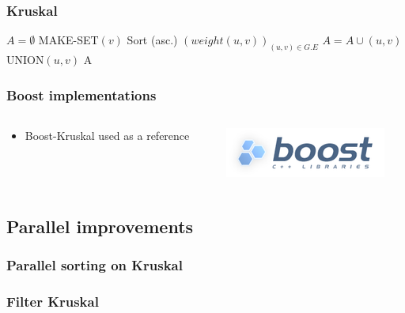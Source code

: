 \documentclass{beamer}
\begin{document}
\begin{frame}[fragile]
\frametitle{Kruskal}
\small
\begin{algorithm}[H]
\begin{algorithmic}[1]
\STATE $A = \emptyset$
\STATE MAKE-SET$(v)$
\ENDFOR
\STATE Sort (asc.) $\left(weight(u, v)\right)_{(u, v) \in G.E}$
\STATE $A = A \cup {(u, v)}$
\STATE UNION$(u, v)$
\ENDIF
\ENDFOR
\RETURN A
\end{algorithmic}
\end{algorithm}


\end{frame}

\begin{frame}
\frametitle{Boost implementations}

\begin{columns}
\begin{column}{.7\linewidth}
\begin{itemize}
\item Boost-Kruskal used as a reference
\end{itemize}
\end{column}

\begin{column}{.3\linewidth}
\includegraphics[width=\linewidth]{boost.png}
\end{column}
\end{columns}

\end{frame}


\subsection{Parallel improvements}

\begin{frame}
\frametitle{Parallel sorting on Kruskal}

\end{frame}

\begin{frame}
\frametitle{Filter Kruskal}

\end{frame}
\end{document}
